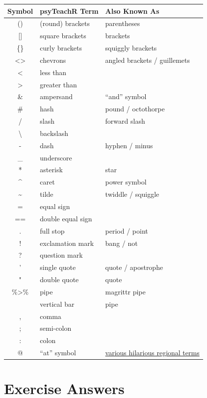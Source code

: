 \documentclass[
  oneside]{book}
\begin{document}
\begin{longtable}[]{@{}cll@{}}
\toprule
Symbol & psyTeachR Term & Also Known As \\
\midrule
\endhead
() & (round) brackets & parentheses \\
{[}{]} & square brackets & brackets \\
\{\} & curly brackets & squiggly brackets \\
\textless\textgreater{} & chevrons & angled brackets / guillemets \\
\textless{} & less than & \\
\textgreater{} & greater than & \\
\& & ampersand & ``and'' symbol \\
\# & hash & pound / octothorpe \\
/ & slash & forward slash \\
\textbackslash{} & backslash & \\
- & dash & hyphen / minus \\
\_ & underscore & \\
* & asterisk & star \\
\^{} & caret & power symbol \\
\textasciitilde{} & tilde & twiddle / squiggle \\
= & equal sign & \\
== & double equal sign & \\
. & full stop & period / point \\
! & exclamation mark & bang / not \\
? & question mark & \\
' & single quote & quote / apostrophe \\
" & double quote & quote \\
\%\textgreater\% & pipe & magrittr pipe \\
\textbar{} & vertical bar & pipe \\
, & comma & \\
; & semi-colon & \\
: & colon & \\
@ & ``at'' symbol & \href{https://www.theguardian.com/notesandqueries/query/0,5753,-1773,00.html}{various hilarious regional terms} \\
\bottomrule
\end{longtable}

\hypertarget{exercise-answers}{%
\chapter{Exercise Answers}\label{exercise-answers}}
\end{document}
